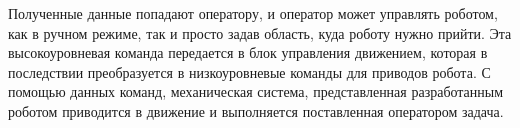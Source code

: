 Полученные данные попадают оператору, и оператор может управлять роботом, как в ручном режиме, так и просто задав область, куда роботу нужно прийти. Эта высокоуровневая команда передается в блок управления движением, которая в последствии преобразуется в низкоуровневые команды для приводов робота. С помощью данных команд, механическая система, представленная разработанным роботом приводится в движение и выполняется поставленная оператором задача.
